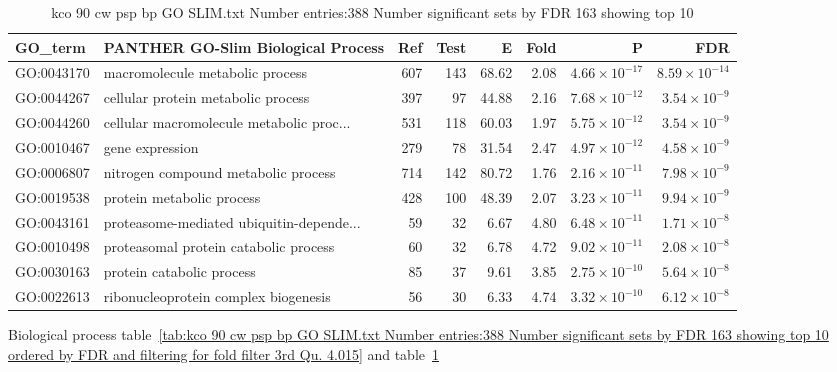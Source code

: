 \begin{table}[ht]
\centering
\begin{adjustbox}{width=\textwidth}
\begin{tabular}{llrrrrrr}
  \hline
GO\_term & PANTHER GO-Slim Biological Process & Ref & Test & E & Fold & P & FDR \\ 
  \hline
GO:0043170 & macromolecule metabolic process  & 607 & 143 & 68.62 & 2.08 & $4.66 \times 10^{-17}$ & $8.59 \times 10^{-14}$ \\ 
  GO:0044267 & cellular protein metabolic process  & 397 & 97 & 44.88 & 2.16 & $7.68 \times 10^{-12}$ & $3.54 \times 10^{-9}$ \\ 
  GO:0044260 & cellular macromolecule metabolic proc... & 531 & 118 & 60.03 & 1.97 & $5.75 \times 10^{-12}$ & $3.54 \times 10^{-9}$ \\ 
  GO:0010467 & gene expression  & 279 & 78 & 31.54 & 2.47 & $4.97 \times 10^{-12}$ & $4.58 \times 10^{-9}$ \\ 
  GO:0006807 & nitrogen compound metabolic process  & 714 & 142 & 80.72 & 1.76 & $2.16 \times 10^{-11}$ & $7.98 \times 10^{-9}$ \\ 
  GO:0019538 & protein metabolic process  & 428 & 100 & 48.39 & 2.07 & $3.23 \times 10^{-11}$ & $9.94 \times 10^{-9}$ \\ 
  GO:0043161 & proteasome-mediated ubiquitin-depende... & 59 & 32 & 6.67 & 4.80 & $6.48 \times 10^{-11}$ & $1.71 \times 10^{-8}$ \\ 
  GO:0010498 & proteasomal protein catabolic process  & 60 & 32 & 6.78 & 4.72 & $9.02 \times 10^{-11}$ & $2.08 \times 10^{-8}$ \\ 
  GO:0030163 & protein catabolic process  & 85 & 37 & 9.61 & 3.85 & $2.75 \times 10^{-10}$ & $5.64 \times 10^{-8}$ \\ 
  GO:0022613 & ribonucleoprotein complex biogenesis  & 56 & 30 & 6.33 & 4.74 & $3.32 \times 10^{-10}$ & $6.12 \times 10^{-8}$ \\ 
  \hline
\end{tabular}
\end{adjustbox}
\caption{kco 90 cw psp bp GO SLIM.txt Number entries:388 Number significant sets by FDR 163 showing top 10} 
\label{tab:kco 90 cw psp bp GO SLIM.txt Number entries:388 Number significant sets by FDR 163 showing top 10}
\end{table}

Biological process table~\ref{tab:kco 90 cw psp bp GO SLIM.txt Number entries:388 Number significant sets by FDR 163 showing top 10 ordered by FDR and filtering for fold filter 3rd Qu. 4.015} and table~\ref{tab:kco 90 cw psp bp GO SLIM.txt Number entries:388 Number significant sets by FDR 163 showing top 10}

